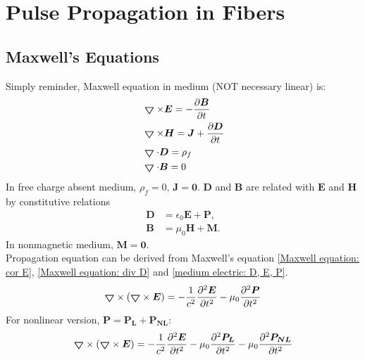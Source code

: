 \documentclass[12pt]{extarticle}
\numberwithin{equation}{section}
\numberwithin{figure}{section}
\numberwithin{table}{section}
\newcommand{\<}{\langle}
\renewcommand{\>}{\rangle}
\theoremstyle{definition}
\newcommand{\Lap}{\boldsymbol{\bigtriangledown}}
\begin{document}
\newpage
\section{Pulse Propagation in Fibers}
    \subsection{Maxwell's Equations}
        Simply reminder, Maxwell equation in medium (NOT necessary linear) is:
        \begin{subequations}
        \label{Maxwell's equation}
            \begin{align}
                &\boldsymbol{\bigtriangledown} \times \boldsymbol{E} = -\pdv{\boldsymbol{B}}{t} \label{Maxwell equation: cor E} \\
                &\boldsymbol{\bigtriangledown} \times \boldsymbol{H} = \boldsymbol{J} + \pdv{\boldsymbol{D}}{t} \label{Maxwell equation: cor H}\\
                &\boldsymbol{\bigtriangledown} \cdot \boldsymbol{D} = \rho_f \label{Maxwell equation: div D}\\
                &\boldsymbol{\bigtriangledown} \cdot \boldsymbol{B} = 0 \label{Maxwell equation: div B}
            \end{align}
        \end{subequations}
        In free charge absent medium, $\rho_f=0$, $\boldsymbol{J}=\boldsymbol{0}$. $\boldsymbol{D}$ and $\boldsymbol{B}$ are related with $\boldsymbol{E}$ and $\boldsymbol{H}$ by constitutive relations
        \begin{subequations}
            \label{Medium electric relations}
            \begin{align}
                \boldsymbol{D} &= \epsilon_0 \boldsymbol{E} + \boldsymbol{P}, \label{medium electric: D, E, P}\\
                \boldsymbol{B} &= \mu_0 \boldsymbol{H} + \boldsymbol{M}. \label{medium electric: B, H, M}
            \end{align}
        \end{subequations}
        In nonmagnetic medium, $\boldsymbol{M}=\boldsymbol{0}$.\\
        Propagation equation can be derived from Maxwell's equation \autoref{Maxwell equation: cor E}, \autoref{Maxwell equation: div D} and \autoref{medium electric: D, E, P}.\\
            \begin{equation}
                \Lap \times (\Lap\times\boldsymbol{E}) = -\frac{1}{c^2}\pdv[2]{\boldsymbol{E}}{t}-\mu_0\pdv[2]{\boldsymbol{P}}{t}
            \end{equation}
        For nonlinear version, $\boldsymbol{P} = \boldsymbol{P_L}+\boldsymbol{P_{NL}}$:
            \begin{equation}
                \Lap \times (\Lap\times\boldsymbol{E}) = -\frac{1}{c^2}\pdv[2]{\boldsymbol{E}}{t}-\mu_0\pdv[2]{\boldsymbol{P_L}}{t}-\mu_0\pdv[2]{\boldsymbol{P_{NL}}}{t}
                \label{propagating equation of E with PL and PNL: including laplace symbol}
            \end{equation}
            
\end{document}
